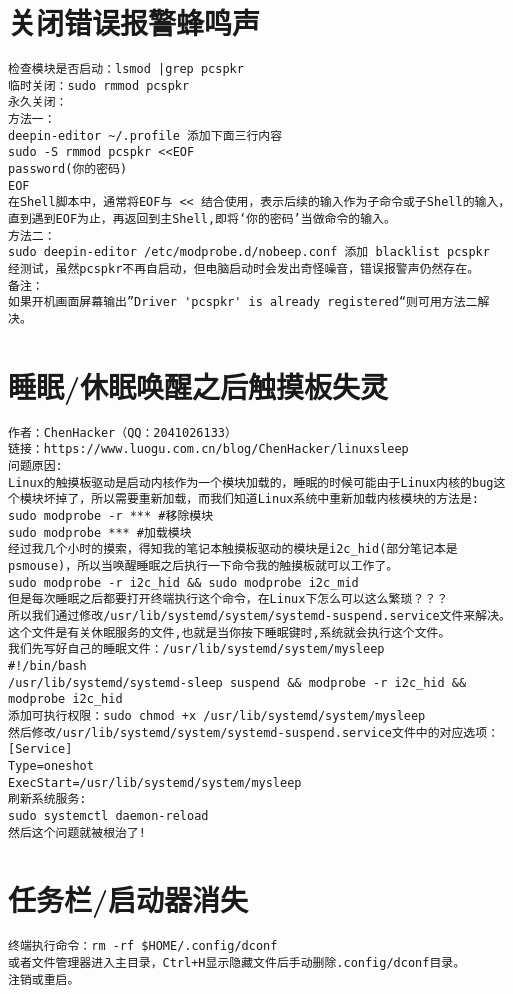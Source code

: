 \documentclass[a4paper,fontset=fandol,zihao=-4,linespread=1.2,oneside]{ctexbook}
\begin{document}
\section{关闭错误报警蜂鸣声}
\begin{lstlisting}
检查模块是否启动：lsmod |grep pcspkr
临时关闭：sudo rmmod pcspkr
永久关闭：
方法一：
deepin-editor ~/.profile 添加下面三行内容
sudo -S rmmod pcspkr <<EOF
password(你的密码)
EOF
在Shell脚本中，通常将EOF与 << 结合使用，表示后续的输入作为子命令或子Shell的输入，直到遇到EOF为止，再返回到主Shell,即将‘你的密码’当做命令的输入。
方法二：
sudo deepin-editor /etc/modprobe.d/nobeep.conf 添加 blacklist pcspkr
经测试，虽然pcspkr不再自启动，但电脑启动时会发出奇怪噪音，错误报警声仍然存在。
备注：
如果开机画面屏幕输出”Driver 'pcspkr' is already registered“则可用方法二解决。
\end{lstlisting}

\section{睡眠/休眠唤醒之后触摸板失灵}
\begin{lstlisting}
作者：ChenHacker（QQ：2041026133）
链接：https://www.luogu.com.cn/blog/ChenHacker/linuxsleep
问题原因:
Linux的触摸板驱动是启动内核作为一个模块加载的，睡眠的时候可能由于Linux内核的bug这个模块坏掉了，所以需要重新加载，而我们知道Linux系统中重新加载内核模块的方法是:
sudo modprobe -r *** #移除模块
sudo modprobe *** #加载模块
经过我几个小时的摸索，得知我的笔记本触摸板驱动的模块是i2c_hid(部分笔记本是psmouse)，所以当唤醒睡眠之后执行一下命令我的触摸板就可以工作了。
sudo modprobe -r i2c_hid && sudo modprobe i2c_mid
但是每次睡眠之后都要打开终端执行这个命令，在Linux下怎么可以这么繁琐？？？
所以我们通过修改/usr/lib/systemd/system/systemd-suspend.service文件来解决。
这个文件是有关休眠服务的文件,也就是当你按下睡眠键时,系统就会执行这个文件。
我们先写好自己的睡眠文件：/usr/lib/systemd/system/mysleep
#!/bin/bash
/usr/lib/systemd/systemd-sleep suspend && modprobe -r i2c_hid && modprobe i2c_hid
添加可执行权限：sudo chmod +x /usr/lib/systemd/system/mysleep
然后修改/usr/lib/systemd/system/systemd-suspend.service文件中的对应选项：
[Service]
Type=oneshot
ExecStart=/usr/lib/systemd/system/mysleep
刷新系统服务:
sudo systemctl daemon-reload
然后这个问题就被根治了!
\end{lstlisting}

\section{任务栏/启动器消失} \label{section:dock_disappear}
\begin{lstlisting}
终端执行命令：rm -rf $HOME/.config/dconf
或者文件管理器进入主目录，Ctrl+H显示隐藏文件后手动删除.config/dconf目录。
注销或重启。
\end{lstlisting}
\end{document}

